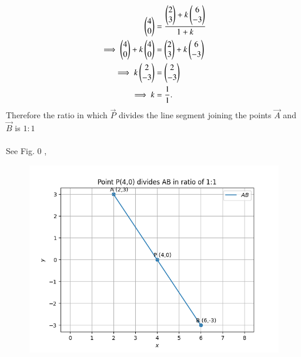 \documentclass[journal]{IEEEtran}
\begin{document}
\begin{align}
         \begin{pmatrix}4\\0\end{pmatrix} &=\frac{{\begin{pmatrix}2\\3\end{pmatrix}+k\begin{pmatrix}6\\-3\end{pmatrix}}}{1+k}\\
    \implies\begin{pmatrix}4\\0\end{pmatrix} + k\begin{pmatrix}4\\0\end{pmatrix} &=\begin{pmatrix}2\\3\end{pmatrix}+k\begin{pmatrix}6\\-3\end{pmatrix}\\ 
	 \implies k\begin{pmatrix}2 \\ -3\end{pmatrix} &= \begin{pmatrix}2 \\ -3\end{pmatrix}
	 \\
	 \implies k &= \frac{1}{1}.
\end{align}
\bigskip
Therefore the ratio in which $\vec{P}$ divides the line segment joining the points $\vec{A}$ and $\vec{B}$ is $1:1$\\
\\
See Fig. 0 ,
\begin{figure}[H]
\begin{center}
\includegraphics[width=0.6\columnwidth]{figs/fig.png}
\end{center}
\caption{}
\label{fig:Fig1}
\end{figure}
\end{document}
